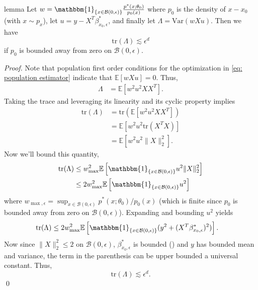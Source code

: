 \documentclass[11pt]{article}
\begin{document}
\begin{restatable}{lemma}{} \label{lemma: Lambda trace bound}
    Let $w = \mathbbm{1}_{\{x \in \mathcal{B}(0, \epsilon)\}}\frac{p^*(x; \theta_0)}{p_0(x)}$ where $p_0$ is the density of $x - x_0$ (with $x \sim p_x$), let $u = y - X^T\beta_{x_0, \epsilon}^*$, and finally let $\Lambda = \text{Var}(wXu)$. Then we have
    \[\text{tr}\left(\Lambda\right) \lesssim \epsilon^{d} \]
    if $p_0$ is bounded away from zero on $\mathcal{B}(0, \epsilon)$.
\end{restatable}
\noindent \textit{Proof.} Note that population first order conditions for the optimization in \cref{eq: population estimator} indicate that $\mathbb{E}[wXu] = 0$. Thus,
\begin{align*}
    \Lambda &= \mathbb{E}\left[w^2u^2XX^T\right].
\end{align*}
Taking the trace and leveraging its linearity and its cyclic property implies
\begin{align*}
    \text{tr}(\Lambda) &= \text{tr}\left(\mathbb{E}\left[w^2u^2XX^T\right]\right) \\
    &= \mathbb{E}\left[w^2u^2\text{tr}\left(X^TX\right)\right] \\
    &= \mathbb{E}\left[w^2u^2\|X\|_2^2\right]. 
\end{align*}
Now we'll bound this quantity,
\begin{align*}
    \text{tr}(\Lambda) &\leq  w_{\max}^2\mathbb{E}\left[\mathbbm{1}_{\{x \in \mathcal{B}(0, \epsilon)\}}u^2\|X\|_2^2\right] \\
    &\leq 2w_{\max}^2\mathbb{E}\left[\mathbbm{1}_{\{x \in \mathcal{B}(0, \epsilon)\}}u^2\right]
\end{align*}
where $w_{\max, \epsilon} = \sup_{x \in \mathcal{B}(0, \epsilon)}p^*(x; \theta_0)/p_0(x)$ (which is finite since $p_0$ is bounded away from zero on $\mathcal{B}(0, \epsilon)$). Expanding and bounding $u^2$ yields
\begin{align*}
    \text{tr}(\Lambda) &\leq 2w_{\max}^2\mathbb{E}\left[\mathbbm{1}_{\{x \in \mathcal{B}(0, \epsilon)\}}(y^2 + (X^T\beta^*_{x_0, \epsilon})^2)\right]. 
\end{align*}
Now since $\|X\|_2^2 \leq 2$ on $\mathcal{B}(0, \epsilon)$, $\beta^*_{x_0, \epsilon}$ is bounded () and $y$ has bounded mean and variance, the term in the parenthesis can be upper bounded a universal constant. Thus,
\[\text{tr}(\Lambda) \lesssim \epsilon^d.\]
\qed{}
\end{document}
